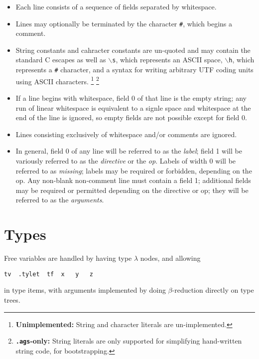 \documentclass{article}
\newcommand\bs{$\backslash$}
\newcommand\stringcode[1]{\texttt{#1}}
\newcommand\unimpl[1]{\footnote{\textbf{Unimplemented: }#1}}
\newcommand\agsonly[1]{\footnote{\textbf{\texttt{.ags}-only: }#1}}
\begin{document}
\begin{itemize}
    \item Each line consists of a sequence of fields separated by whitespace.

    \item Lines may optionally be terminated by the character \stringcode{\#}, which begins a comment.

    \item String constants and cahracter constants are un-quoted and may contain the standard C escapes as well as
        \stringcode{\bs{}s}, which represents an ASCII space,
        \stringcode{\bs{}h}, which represents a \stringcode{\#} character,
        and a syntax for writing arbitrary UTF coding units using ASCII characters.
        \unimpl{String and character literals are un-implemented.}
        \agsonly{String literals are only supported for simplifying hand-written string code, for bootstrapping.}

    \item If a line begins with whitespace, field 0 of that line is the empty string;
        any run of linear whitespace is equivalent to a signle space and whitespace at the end of the line is ignored,
        so empty fields are not possible except for field 0.

    \item Lines consisting exclusively of whitespace and/or comments are ignored.

    \item In general, field 0 of any line will be referred to as the \emph{label};
        field 1 will be variously referred to as the \emph{directive} or the \emph{op}.
        Labels of width 0 will be referred to as \emph{missing};
        labels may be required or forbidden, depending on the op.
        Any non-blank non-comment line must contain a field 1;
        additional fields may be required or permitted depending on the directive or op;
        they will be referred to as the \emph{arguments}.
\end{itemize}

\section{Types}

Free variables are handled by having type $\lambda$ nodes, and allowing
\begin{verbatim}
tv	.tylet	tf	x	y	z
\end{verbatim}
in type items, with arguments implemented by doing $\beta$-reduction directly on type trees.
\end{document}
